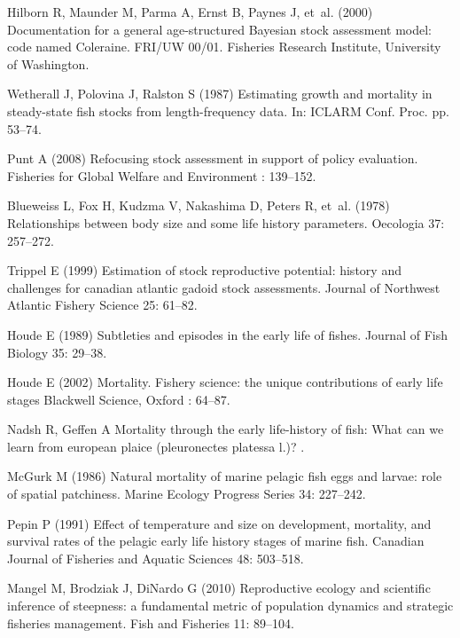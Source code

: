 \documentclass{pnastwo}
\begin{document}
\begin{article}
\begin{thebibliography}{10}
Hilborn R, Maunder M, Parma A, Ernst B, Paynes J, et~al. (2000) Documentation
  for a general age-structured Bayesian stock assessment model: code named
  Coleraine.
FRI/UW 00/01. Fisheries Research Institute, University of Washington.

Wetherall J, Polovina J, Ralston S (1987) Estimating growth and mortality in
  steady-state fish stocks from length-frequency data.
In: ICLARM Conf. Proc. pp. 53--74.

Punt A (2008) Refocusing stock assessment in support of policy evaluation.
Fisheries for Global Welfare and Environment : 139--152.

Blueweiss L, Fox H, Kudzma V, Nakashima D, Peters R, et~al. (1978)
  Relationships between body size and some life history parameters.
Oecologia 37: 257--272.

Trippel E (1999) Estimation of stock reproductive potential: history and
  challenges for canadian atlantic gadoid stock assessments.
Journal of Northwest Atlantic Fishery Science 25: 61--82.

Houde E (1989) Subtleties and episodes in the early life of fishes.
Journal of Fish Biology 35: 29--38.

Houde E (2002) Mortality.
Fishery science: the unique contributions of early life stages
  Blackwell Science, Oxford : 64--87.

Nadsh R, Geffen A Mortality through the early life-history of fish: What can we
  learn from european plaice (pleuronectes platessa l.)? .

McGurk M (1986) Natural mortality of marine pelagic fish eggs and larvae: role
  of spatial patchiness.
Marine Ecology Progress Series 34: 227--242.

Pepin P (1991) Effect of temperature and size on development, mortality, and
  survival rates of the pelagic early life history stages of marine fish.
Canadian Journal of Fisheries and Aquatic Sciences 48: 503--518.

Mangel M, Brodziak J, DiNardo G (2010) Reproductive ecology and scientific
  inference of steepness: a fundamental metric of population dynamics and
  strategic fisheries management.
Fish and Fisheries 11: 89--104.


\end{thebibliography}
\end{article}
\end{document}
